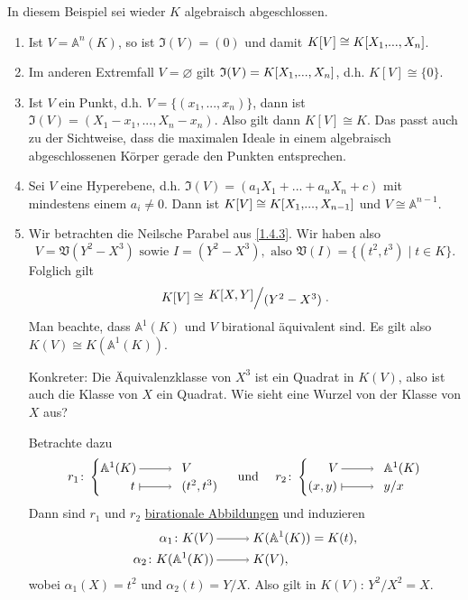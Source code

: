 \documentclass[a4paper,12pt,index=toc]{scrbook}
\theoremstyle{keinenummern} %
\def\A{\mathbb{A}}
\def\V{\mathfrak{V}}
\def\I{\mathfrak{I}}
\newcommand{\leer}{\ensuremath{\varnothing}}
\renewcommand{\dotsc}{\ensuremath{\!...}}
\newcommand{\polyx}[1][n]{\ensuremath%
  [X_{1},\dotsc,X_{#1}]}
\begin{document}
\begin{bsp}\label{1.4.8} In diesem Beispiel sei wieder $K$ algebraisch abgeschlossen.
\begin{enumerate}
\item{} Ist $V=\A^n(K)$, so ist $\I(V)=(0)$ und damit $K[V]\cong K\polyx$.
\item{} Im anderen Extremfall $V=\leer$ gilt $\I(V)=K\polyx$, d.h. $K[V]\cong \{0\}$.
\item{} Ist $V$ ein Punkt, d.h. $V=\{(x_1,\dotsc,x_n)\}$, dann ist $\I(V)=(X_1-x_1,\dotsc,X_n-x_n)$. Also gilt dann $K[V]\cong K$. Das passt auch zu der Sichtweise, dass die maximalen Ideale in einem algebraisch abgeschlossenen Körper gerade den Punkten entsprechen.
\item{} Sei $V$ eine Hyperebene, d.h. $\I(V)=(a_1X_1+\dotsc+a_nX_n+c)$ mit mindestens einem $a_i\neq 0$.
Dann ist $K[V]\cong K\polyx[n-1]$ und $V\cong \A^{n-1}$.
\item{} Wir betrachten die Neilsche Parabel aus \cref{1.4.3}. Wir haben also 
\begin{equation*}V=\V(Y^2-X^3)\text{ sowie }I=(Y^2-X^3),\text{ also }\V(I)=\{(t^2,t^3) \mid t\in K\}.\end{equation*} 
Folglich gilt
\begin{equation*}K[V]\cong \Quotient{K[X,Y]}{(Y^2-X^3)}.\end{equation*} 
Man beachte, dass $\A^1(K)$ und $V$  birational äquivalent sind. Es gilt also $K(V)\cong K(\A^1(K))$. 

Konkreter:
Die Äquivalenzklasse von $X^3$ ist ein Quadrat in $K(V)$, also ist auch die Klasse von $X$ ein Quadrat.
Wie sieht eine Wurzel von der Klasse von $X$ aus? 

Betrachte  dazu
\begin{equation*}r_1\colon  \begin{cases} \A^1(K)\ra&\!\!\! V \\ \hfill t\mapsto &\!\!\!(t^2,t^3) \end{cases}\quad \text{ und } \quad r_2\colon  \begin{cases} \hfill V\ra&\!\!\! \A^1(K) \\ (x,y) \mapsto &\!\!\! y/x\end{cases}\end{equation*}
Dann sind $r_1$ und $r_2$ \hyperref[1.6.5]{birationale Abbildungen} und induzieren 
\begin{align*}\alpha_1\colon  K(V)&\ra K(\A^1(K))=K(t),\\
\alpha_2\colon  K(\A^1(K))&\ra K(V),\end{align*}
wobei $\alpha_1(X)=t^2$ und $\alpha_2(t)=Y/X$. Also gilt in $K(V)$: $Y^2/X^2=X$.


\end{enumerate}
\end{bsp}
\end{document}
